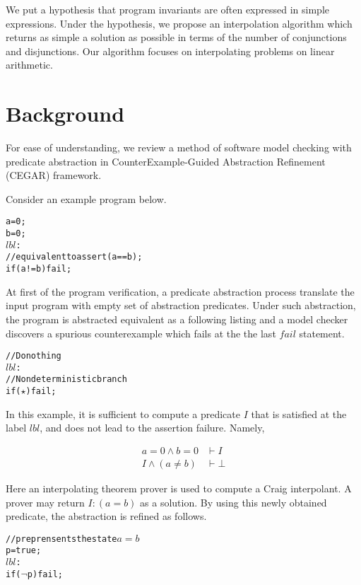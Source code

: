 We put a hypothesis that program invariants are often expressed in
simple expressions. Under the hypothesis, we propose an interpolation
algorithm which returns as simple a solution as possible in terms of
the number of conjunctions and disjunctions.  Our algorithm focuses on
interpolating problems on linear arithmetic.


\section{Background}

For ease of understanding, we review a method of software model
checking with predicate abstraction\cite{conf/cav/GrafS97} in
CounterExample-Guided Abstraction Refinement (CEGAR) framework.

Consider an example program below.

\begin{alltt}
    a = 0;
    b = 0;
\(lbl\):
    // equivalent to assert (a == b);
    if (a != b) fail;
\end{alltt}

At first of the program verification, a predicate abstraction process
translate the input program with empty set of abstraction predicates.
Under such abstraction, the program is abstracted equivalent as a
following listing and a model checker discovers a spurious
counterexample which fails at the the last $fail$ statement.

\begin{alltt}
    // Do nothing
\(lbl\):
    // Non deterministic branch
    if (\(\star\)) fail;
\end{alltt}

In this example, it is sufficient to compute a predicate $I$ that is
satisfied at the label $lbl$, and does not lead to the assertion
failure.  Namely,

\begin{align*}
a = 0 \wedge b = 0 & \vdash I \\
I \wedge (a \neq b) & \vdash \bot
\end{align*}

Here an interpolating theorem prover is used to compute a
Craig interpolant.  A prover may return $I: (a = b)$ as a solution.
By using this newly obtained predicate, the abstraction is refined as follows.

\begin{alltt}
    // p reprensents the state \(a=b\)
    p = true;
\(lbl\):
    if (\(\neg\)p) fail;
\end{alltt}

